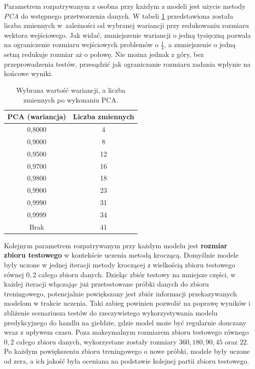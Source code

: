 \documentclass[a4paper, twoside, 11pt, openright]{article}
\begin{document}
\bigskip

Parametrem rozpatrywanym z osobna przy każdym z modeli jest użycie metody \textit{PCA} do wstępnego przetworzenia danych. W tabeli \ref{tab:pca_component_number} przedstawiona została liczba zmiennych w~zależności od wybranej wariancji przy redukowaniu rozmiaru wektora wejściowego. Jak widać, zmniejszenie wariancji o jedną tysięczną pozwala na ograniczenie rozmiaru wejściowych problemów o $\frac{1}{4}$, a zmniejszenie o jedną setną redukuje rozmiar aż o połowę. Nie można jednak z góry, bez przeprowadzenia testów, przesądzić jak ograniczanie rozmiaru zadania wpłynie na końcowe wyniki. 


\begin{table}[H]
    \centering
    \begin{tabular}{|c|c|}
    \hline
        \textbf{PCA (wariancja)} & \textbf{Liczba zmiennych} \\ \hline
        0,8000 & 4 \\ \hline 
        0,9000 & 8 \\ \hline 
        0,9500 & 12 \\ \hline 
        0,9700 & 16 \\ \hline 
        0,9800 & 18 \\ \hline 
        0,9900 & 23 \\ \hline
        0,9990 & 31 \\ \hline 
        0,9999 & 34 \\ \hline 
        Brak & 41 \\ \hline 
    \end{tabular}
    \caption{Wybrana wartość wariancji, a liczba zmiennych po wykonaniu PCA.}
    \label{tab:pca_component_number}
\end{table}

\bigskip

Kolejnym parametrem rozpatrywanym przy każdym modelu jest \textbf{rozmiar zbioru testowego} w kontekście uczenia metodą kroczącą. Domyślnie modele były uczone w jednej iteracji metody kroczącej z wielkością zbioru testowego równej $0,2$ całego zbioru danych. Dzieląc zbiór testowy na mniejsze części, w każdej iteracji włączając już przetestowane próbki danych do zbioru treningowego, potencjalnie powiększany jest zbiór informacji przekazywanych modelom w trakcie uczenia. Taki zabieg  powinien pozwolić na poprawę wyników i zbliżenie scenariusza testów do rzeczywistego wykorzystywania modelu predykcyjnego do handlu na giełdzie, gdzie model może być regularnie douczany wraz z upływem czasu. Poza maksymalnym rozmiarem zbioru testowego równego $0,2$ całego zbioru danych, wykorzystane zostały rozmiary $360, 180, 90, 45$ oraz $22$. Po każdym powiększeniu zbioru treningowego o nowe próbki, modele były uczone od zera, a ich jakość była oceniana na podstawie kolejnej partii zbioru testowego.
\end{document}

